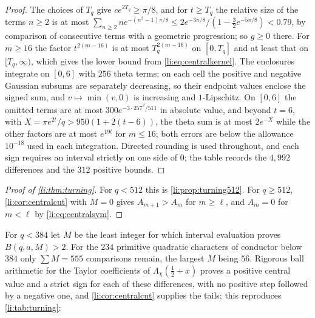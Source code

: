 \begin{proof}
The choices of $T_q$ give $ce^{2T_q}\ge\pi/8$, and for $t\ge T_q$ the relative size of the terms $n\ge2$ is
at most $\sum_{n\ge2}ne^{-(n^2-1)\pi/8}\le2e^{-3\pi/8}/(1-\frac32e^{-5\pi/8})<0.79$, by comparison of
consecutive terms with a geometric progression; so $g\ge0$ there. For $m\ge16$ the factor $t^{2(m-16)}$
is at most $T_q^{2(m-16)}$ on $[0,T_q]$ and at least that on $[T_q,\infty)$, which gives the lower bound from
\eqref{li:eq:centralkernel}. The enclosures integrate on $[0,6]$ with $256$ theta terms: on each cell the
positive and negative Gaussian subsums are separately decreasing, so their endpoint values enclose the
signed sum, and $v\mapsto\min(v,0)$ is increasing and $1$-Lipschitz. On $[0,6]$ the omitted terms are at
most $300e^{-3\cdot257^2/511}$ in absolute value, and beyond $t=6$, with $X=\pi e^{2t}/q>950(1+2(t-6))$,
the theta sum is at most $2e^{-X}$ while the other factors are at most $e^{19t}$ for $m\le16$; both
errors are below the allowance $10^{-18}$ used in each integration. Directed rounding is used
throughout, and each sign requires an interval strictly on one side of $0$; the table records the
$4{,}992$ differences and the $312$ positive bounds.
\end{proof}

\begin{proof}[Proof of \cref{li:thm:turning}]
For $q<512$ this is \cref{li:prop:turning512}. For $q\ge512$, \cref{li:cor:centralcut} with $M=0$ gives
$A_{m+1}>A_m$ for $m\ge\ell$, and $A_m=0$ for $m<\ell$ by \eqref{li:eq:centralsym}.
\end{proof}

\begin{remark}\label{li:rem:centralflint}
For $q<384$ let $M$ be the least integer for which interval evaluation proves $B(q,a,M)>2$. For the
$234$ primitive quadratic characters of conductor below $384$ only $\sum M=555$ comparisons remain, the
largest $M$ being $56$. Rigorous ball arithmetic for the Taylor coefficients of $\Lambda_\chi(\frac12+x)$
\cite{Johansson2017Arb} proves a positive central value and a strict sign for each of these differences,
with no positive step followed by a negative one, and \cref{li:cor:centralcut} supplies the tails; this
reproduces \cref{li:tab:turning}:
\begin{center}
\end{center}
\end{remark}

